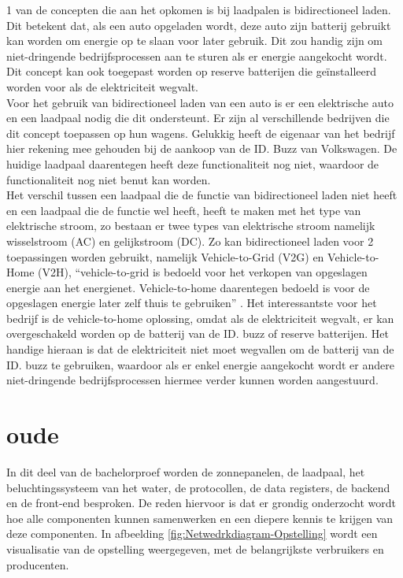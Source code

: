 1 van de concepten die aan het opkomen is bij laadpalen is bidirectioneel laden. Dit betekent dat, als een auto opgeladen wordt, deze auto zijn batterij gebruikt kan worden om energie op te slaan voor later gebruik. Dit zou handig zijn om niet-dringende bedrijfsprocessen aan te sturen als er energie aangekocht wordt. Dit concept kan ook toegepast worden op reserve batterijen die geïnstalleerd worden voor als de elektriciteit wegvalt.\\

Voor het gebruik van bidirectioneel laden van een auto is er een elektrische auto en een laadpaal nodig die dit ondersteunt. Er zijn al verschillende bedrijven die dit concept toepassen op hun wagens. Gelukkig heeft de eigenaar van het bedrijf hier rekening mee gehouden bij de aankoop van de ID. Buzz van Volkswagen. De huidige laadpaal daarentegen heeft deze functionaliteit nog niet, waardoor de functionaliteit nog niet benut kan worden.\\

Het verschil tussen een laadpaal die de functie van bidirectioneel laden niet heeft en een laadpaal die de functie wel heeft, heeft te maken met het type van elektrische stroom, zo bestaan er twee types van elektrische stroom namelijk wisselstroom (AC) en gelijkstroom (DC). Zo kan bidirectioneel laden voor 2 toepassingen worden gebruikt, namelijk Vehicle-to-Grid (V2G) en Vehicle-to-Home (V2H), “vehicle-to-grid is bedoeld voor het verkopen van opgeslagen energie aan het energienet. Vehicle-to-home daarentegen bedoeld is voor de opgeslagen energie later zelf thuis te gebruiken” \autocite{LAZZERONI2019704}. Het interessantste voor het bedrijf is de vehicle-to-home oplossing, omdat als de elektriciteit wegvalt, er kan overgeschakeld worden op de batterij van de ID. buzz of reserve batterijen. Het handige hieraan is dat de elektriciteit niet moet wegvallen om de batterij van de ID. buzz te gebruiken, waardoor als er enkel energie aangekocht wordt er andere niet-dringende bedrijfsprocessen hiermee verder kunnen worden aangestuurd.

\section{oude}
\label{sec:stand-van-zaken-oude}

In dit deel van de bachelorproef worden de zonnepanelen, de laadpaal, het beluchtingssysteem van het water, de protocollen, de data registers, de backend en de front-end besproken. De reden hiervoor is dat er grondig onderzocht wordt hoe alle componenten kunnen samenwerken en een diepere kennis te krijgen van deze componenten. In afbeelding \ref{fig:Netwedrkdiagram-Opstelling} wordt een visualisatie van de opstelling weergegeven, met de belangrijkste verbruikers en producenten.

